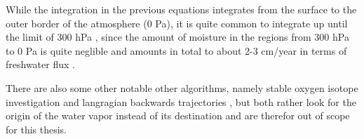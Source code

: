 While the integration in the previous equations integrates from the surface to the outer border of the atmosphere (0 Pa), it is quite common to integrate up until the limit of 300 hPa \cite{ayantobo_integrated_2022, zhu_proposed_1998, kim_ensos_2015, guirguis_circulation_2018}, since the amount of moisture in the regions from 300 hPa to 0 Pa is quite neglible and amounts in total to about 2-3 cm/year in terms of freshwater flux \cite{zhou_atmospheric_2005}.

There are also some other notable other algorithms, namely stable oxygen isotope investigation \cite{ma_atmospheric_2018} and langragian backwards trajectories \cite{zhao_lagrangian_2021}, but both rather look for the origin of the  water vapor instead of its destination and are therefor out of scope for this thesis.

%
%
%
%
%
%
%
%
%
%

